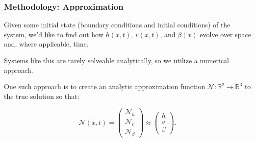 \begin{frame}
    \frametitle{Methodology: Approximation}

    Given some initial state (boundary conditions and initial conditions) of the system, we'd like to find out how
    $h(x, t)$, $v(x, t)$, and $\beta(x)$ evolve over space and, where applicable, time.

    \bigskip
    \pause
    Systems like this are rarely solveable analytically, so we utilize a numerical approach. 

    \bigskip
    \pause
    One such approach is to create an analytic approximation function $\mathcal{N}: \mathbb{R}^2 \to \mathbb{R}^3$ to the true solution so that:

    $$
    \mathcal{N}(x, t) = \begin{pmatrix*}
        \mathcal{N}_h \\
        \mathcal{N}_v \\
        \mathcal{N}_\beta 
    \end{pmatrix*} \approx \begin{pmatrix*}
        h \\
        v \\
        \beta
    \end{pmatrix*}.
    $$
\end{frame}